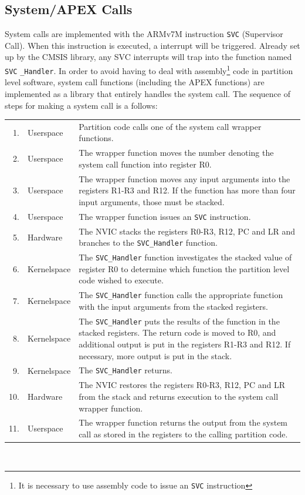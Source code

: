 \subsection{System/APEX Calls}
\label{ssec:impl_system_calls}
System calls are implemented with the ARMv7M instruction \texttt{SVC} (Supervisor
Call). When this instruction is executed, a interrupt will be triggered. Already
set up by the CMSIS library, any SVC interrupts will trap into the function
named \texttt{SVC} \texttt{\_Handler}.
In order to avoid having to deal with assembly\footnote{It is necessary to use
assembly code to issue an \texttt{SVC} instruction} code in partition level
software, system call functions (including the APEX functions) are implemented
as a library that entirely handles the system call.
The sequence of steps for making a system call is a follows:\\

\noindent\begin{tabular}{ r l p{10.5cm} }
    1. & Userspace & Partition code calls one of the system call wrapper
    functions.\\
    2. & Userspace & The wrapper function moves the number denoting the system
    call function into register R0.\\
    3. & Userspace & The wrapper function moves any input arguments into the
    registers R1-R3 and R12. If the function has more than four input arguments,
    those must be stacked.\\
    4. & Userspace & The wrapper function issues an \texttt{SVC} instruction.\\
    5. & Hardware & The NVIC stacks the registers R0-R3, R12, PC and LR and
    branches to the \texttt{SVC\_Handler} function.\\
    6. & Kernelspace & The \texttt{SVC\_Handler} function investigates the
    stacked value of register R0 to determine which function the partition level
    code wished to execute.\\
    7. & Kernelspace & The \texttt{SVC\_Handler} function calls the appropriate
    function with the input arguments from the stacked registers.\\
    8. & Kernelspace & The \texttt{SVC\_Handler} puts the results of the
    function in the stacked registers. The return code is moved to R0, and
    additional output is put in the registers R1-R3 and R12. If necessary, more
    output is put in the stack.\\
    9. & Kernelspace & The \texttt{SVC\_Handler} returns.\\
    10. & Hardware & The NVIC restores the registers R0-R3, R12, PC and LR from
    the stack and returns execution to the system call wrapper function.\\
    11. & Userspace & The wrapper function returns the output from the system
    call as stored in the registers to the calling partition code.\\
\end{tabular}\\


